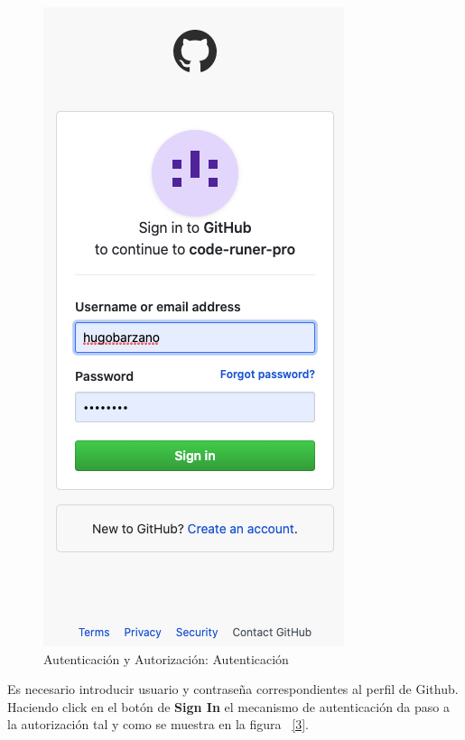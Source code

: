\documentclass[a4paper,11pt]{book}
\begin{document}
\begin{figure}[H]
\centering
\includegraphics[scale=0.7]{imagenes/casouso_a/2.png}
\caption{  Autenticación y Autorización: Autenticación }
\label{2}
\end{figure}

Es necesario introducir usuario y contraseña correspondientes al perfil de Github. Haciendo click en el botón de  \textbf{Sign In} el mecanismo de autenticación da paso a  la autorización tal y como se muestra en la figura  ~\ref{3}.  
\end{document}
